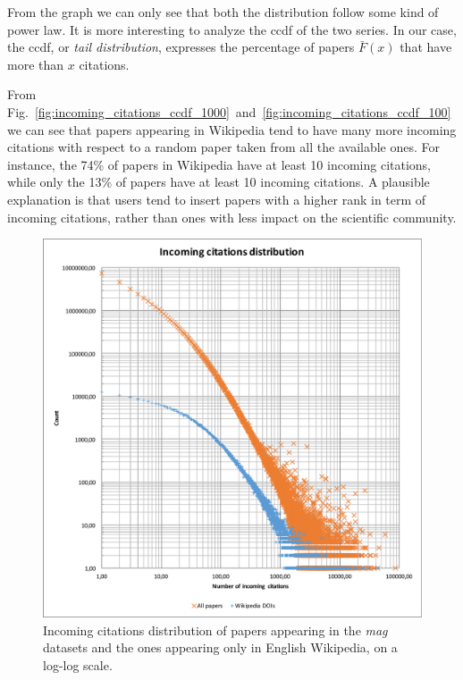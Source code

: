 From the graph we can only see that both the distribution follow some kind of power law.
It is more interesting to analyze the \ac{ccdf} of the two series.
In our case, the \ac{ccdf}, or \emph{tail distribution}, expresses the percentage of papers $\bar{F}(x)$ that have more than $x$ citations.

From Fig.~\ref{fig:incoming_citations_ccdf_1000}~and~\ref{fig:incoming_citations_ccdf_100} we can see that papers appearing in Wikipedia tend to have many more incoming citations with respect to a random paper taken from all the available ones.
For instance, the 74\% of papers in Wikipedia have at least 10 incoming citations, while only the 13\% of papers have at least 10 incoming citations.
A plausible explanation is that users tend to insert papers with a higher rank in term of incoming citations, rather than ones with less impact on the scientific community.


\begin{figure}[h]
\centering
\includegraphics[keepaspectratio=true, width=\textwidth]{assets/incoming_cits_loglog}
\caption{Incoming citations distribution of papers appearing in the \emph{mag} datasets and the ones appearing only in English Wikipedia, on a log-log scale.}
\label{fig:incoming_citations_loglog}
\end{figure}


